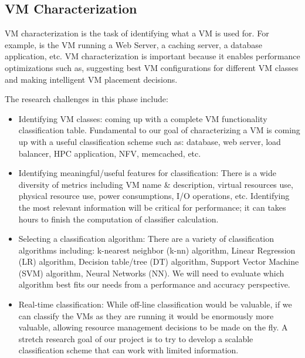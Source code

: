 \subsection{VM Characterization}
VM characterization is the task of identifying what a VM is used for. For example, is the VM running a Web Server, a caching server, a database application, etc. VM characterization is important because it enables performance optimizations such as, suggesting best VM configurations for different VM classes and making intelligent VM placement decisions. 

The research challenges in this phase include:
\begin{itemize}
\item Identifying VM classes: coming up with a complete VM functionality classification table. Fundamental to our goal of characterizing a VM is coming up with a useful classification scheme such as: database, web server, load balancer, HPC application, NFV, memcached, etc.  

\item Identifying meaningful/useful features for classification: There is a wide diversity of metrics including VM name \& description, virtual resources use, physical resource use, power consumptions, I/O operations, etc.  Identifying the most relevant information will be critical for performance; it can takes hours to finish the computation of classifier calculation. 

\item Selecting a classification algorithm: There are a variety of classification algorithms including: k-nearest neighbor (k-nn) algorithm, Linear Regression (LR) algorithm, Decision table/tree (DT) algorithm, Support Vector Machine (SVM) algorithm, Neural Networks (NN). We will need to evaluate which algorithm best fits our needs from a performance and accuracy perspective. 

\item Real-time classification: While off-line classification would be valuable, if we can classify the VMs as they are running it would be enormously more valuable, allowing resource management decisions to be made on the fly.  A stretch research goal of our project is to try to develop a scalable classification scheme that can work with limited information. 

\end{itemize}

